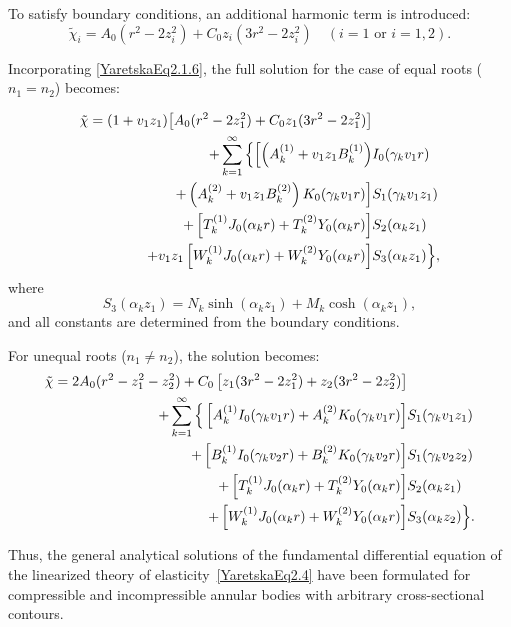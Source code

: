 To satisfy boundary conditions, an additional harmonic term is introduced:
\begin{equation} \label{YaretskaEq2.1.6}
	\tilde{\chi}_i = A_0 (r^2 - 2 z_i^2) + C_0 z_i (3r^2 - 2 z_i^2) \quad (i=1 \text{ or } i=1,2).
\end{equation}

Incorporating \eqref{YaretskaEq2.1.6}, the full solution for the case of equal roots ($n_1 = n_2$) becomes:

\begin{align}
	\tilde{\chi} = (1 + v_1 z_1)\big[ A_0 (r^2 - 2 z_1^2) + C_0 z_1 (3r^2 - 2 z_1^2) \big] &
	\notag \\
	 + \sum_{k=1}^{\infty} \Big\{ 
	\Bigl[ \left(A_k^{(1)} + v_1 z_1 B_k^{(1)}\right) &I_0(\gamma_k v_1 r) 
	\notag\\
	+ \left(A_k^{(2)} + v_1 z_1 B_k^{(2)}\right) K_0(\gamma_k v_1 r) \Bigr] &S_1(\gamma_k v_1 z_1) 
	\notag \\
	+ \left[ T_k^{(1)} J_0(\alpha_k r) + T_k^{(2)} Y_0(\alpha_k r) \right] &S_2(\alpha_k z_1) 
	\notag \\
	 + v_1 z_1 \left[ W_k^{(1)} J_0(\alpha_k r) + W_k^{(2)} Y_0(\alpha_k r) \right] &S_3(\alpha_k z_1) \Big\}, \label{YaretskaEq2.1.7}
\end{align}
where
\[
S_3(\alpha_k z_1) = N_k \sinh(\alpha_k z_1) + M_k \cosh(\alpha_k z_1),
\]
and all constants are determined from the boundary conditions.

For unequal roots ($n_1 \ne n_2$), the solution becomes:
\begin{align}
	\tilde{\chi} = 2 A_0 (r^2 - z_1^2 - z_2^2) + C_0 \left[ z_1 (3r^2 - 2 z_1^2) + z_2 (3r^2 - 2 z_2^2) \right]&
	\notag\\
	 + \sum_{k=1}^\infty \Big\{
	\left[ A_k^{(1)} I_0(\gamma_k v_1 r) + A_k^{(2)} K_0(\gamma_k v_1 r) \right] &S_1(\gamma_k v_1 z_1) 
	\notag\\
	 + \left[ B_k^{(1)} I_0(\gamma_k v_2 r) + B_k^{(2)} K_0(\gamma_k v_2 r) \right] &S_1(\gamma_k v_2 z_2) 
	 \notag\\
	  + \left[ T_k^{(1)} J_0(\alpha_k r) + T_k^{(2)} Y_0(\alpha_k r) \right] &S_2(\alpha_k z_1) 
	  \notag\\
	  + \left[ W_k^{(1)} J_0(\alpha_k r) + W_k^{(2)} Y_0(\alpha_k r) \right] &S_3(\alpha_k z_2) \Big\}. \label{YaretskaEq2.1.8}
\end{align}

Thus, the general analytical solutions of the fundamental differential equation of the linearized theory of elasticity~\eqref{YaretskaEq2.4} have been formulated for compressible and incompressible annular bodies with arbitrary cross-sectional contours.

